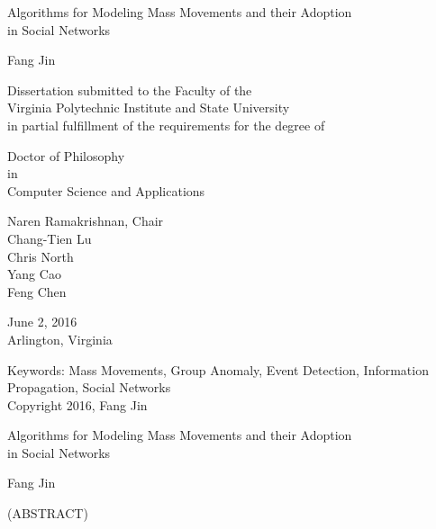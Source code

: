 \documentclass[12pt,dvips]{report}
\begin{document}
\thispagestyle{empty}
\begin{center}

{\Large
Algorithms for Modeling Mass Movements and their Adoption \\ in Social Networks
}


\vfill

Fang Jin

\vfill

Dissertation submitted to the Faculty of the \\
Virginia Polytechnic Institute and State University \\
in partial fulfillment of the requirements for the degree of

\vfill

Doctor of Philosophy \\
in \\
Computer Science and Applications

\vfill

Naren Ramakrishnan, Chair \\
Chang-Tien Lu \\
Chris North \\
Yang Cao \\
Feng Chen

\vfill

June 2, 2016\\
Arlington, Virginia

\vfill

Keywords: Mass Movements, Group Anomaly, Event Detection, Information Propagation, Social Networks
\\
Copyright 2016, Fang Jin

\end{center}

\pagebreak

\thispagestyle{empty}
\begin{center}

{\large
Algorithms for Modeling Mass Movements and their Adoption \\ in Social Networks
}

\vfill

Fang Jin

\vfill

(ABSTRACT)
\vfill

\end{center}
\end{document}

